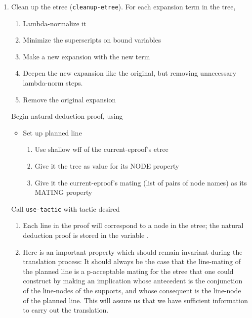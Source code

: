 \begin{enumerate}
\item  Clean up the etree ({\tt cleanup-etree}).  For each expansion term
      in the tree,
   \begin{enumerate}
\item  Lambda-normalize it
      
\item  Minimize the superscripts on bound variables
      
\item Make a new expansion with the new term
      
\item  Deepen the new expansion like the original, but removing 
            unnecessary lambda-norm steps.
      
\item  Remove the original expansion
   \end{enumerate}

 Begin natural deduction proof, using 
   \begin{itemize}
\item  Set up planned line 
	\begin{enumerate}
\item  Use shallow wff of the current-eproof's etree
          
\item  Give it the tree as value for its NODE property
          
\item  Give it the current-eproof's mating (list of pairs of node names)
                as its MATING property
	\end{enumerate}
   \end{itemize}

 Call {\tt use-tactic} with tactic desired
  \begin{enumerate}
\item  Each line in the proof will correspond to a node in the etree; the 
natural deduction proof is stored in the variable .
    
\item   Here is an important property which should remain invariant during
    the translation process:  It should always be the case that the 
    line-mating of the planned line is a p-acceptable mating for the
    etree that one could construct by making an implication whose antecedent
    is the conjunction of the line-nodes of the supports, and whose 
    consequent is the line-node of the planned line.  This will assure us
    that we have sufficient information to carry out the translation.
  \end{enumerate}
\end{enumerate}

